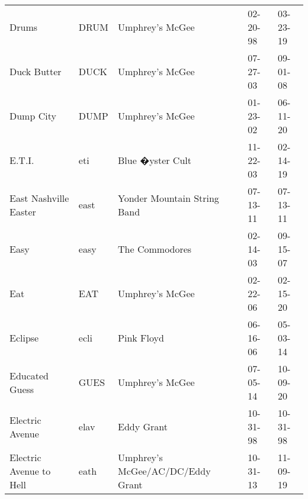 \begin{longtable}{p{}p{}p{}p{}p{}}
                                                                   Drums &          DRUM &                                          Umphrey's McGee &              02-20-98 &             03-23-19 \\
                                                             Duck Butter &          DUCK &                                          Umphrey's McGee &              07-27-03 &             09-01-08 \\
                                                               Dump City &          DUMP &                                          Umphrey's McGee &              01-23-02 &             06-11-20 \\
                                                                  E.T.I. &           eti &                                         Blue �yster Cult &              11-22-03 &             02-14-19 \\
                                                   East Nashville Easter &          east &                              Yonder Mountain String Band &              07-13-11 &             07-13-11 \\
                                                                    Easy &          easy &                                           The Commodores &              02-14-03 &             09-15-07 \\
                                                                     Eat &           EAT &                                          Umphrey's McGee &              02-22-06 &             02-15-20 \\
                                                                 Eclipse &          ecli &                                               Pink Floyd &              06-16-06 &             05-03-14 \\
                                                          Educated Guess &          GUES &                                          Umphrey's McGee &              07-05-14 &             10-09-20 \\
                                                         Electric Avenue &          elav &                                               Eddy Grant &              10-31-98 &             10-31-98 \\
                                                 Electric Avenue to Hell &          eath &                         Umphrey's McGee/AC/DC/Eddy Grant &              10-31-13 &             11-09-19 \\

\end{longtable}
